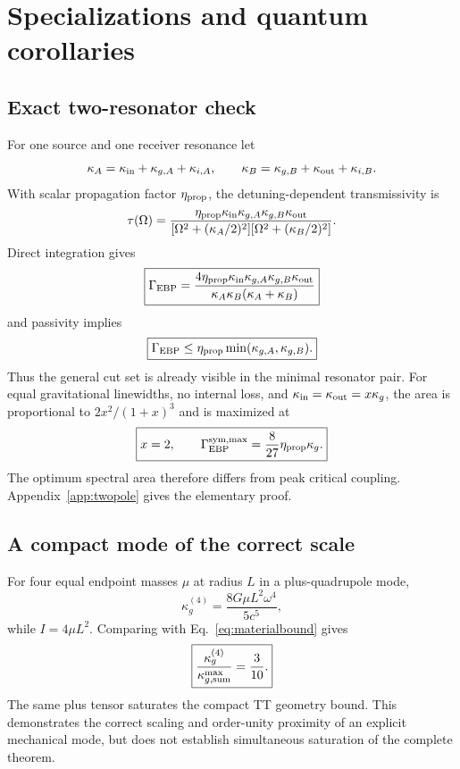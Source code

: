 \section{Specializations and quantum corollaries}
\label{sec:examplescapacity}

\subsection{Exact two-resonator check}

For one source and one receiver resonance let
\begin{equation}
\kappa_A=\kappa_{\rm in}+\kappa_{g,A}+\kappa_{i,A},
\qquad
\kappa_B=\kappa_{g,B}+\kappa_{\rm out}+\kappa_{i,B}.
\end{equation}
With scalar propagation factor $\eta_{\rm prop}$, the detuning-dependent transmissivity is
\begin{equation}
\tau(\Omega)
=\frac{\eta_{\rm prop}\kappa_{\rm in}\kappa_{g,A}\kappa_{g,B}\kappa_{\rm out}}
{[\Omega^2+(\kappa_A/2)^2][\Omega^2+(\kappa_B/2)^2]}.
\label{eq:twopoleTau}
\end{equation}
Direct integration gives
\begin{equation}
\boxed{
\Gamma_{\rm EBP}
=\frac{4\eta_{\rm prop}\kappa_{\rm in}\kappa_{g,A}\kappa_{g,B}\kappa_{\rm out}}
{\kappa_A\kappa_B(\kappa_A+\kappa_B)}}
\label{eq:exactEBP}
\end{equation}
and passivity implies
\begin{equation}
\boxed{
\Gamma_{\rm EBP}\le
\eta_{\rm prop}\min(\kappa_{g,A},\kappa_{g,B}).}
\label{eq:twopolecut}
\end{equation}
Thus the general cut set is already visible in the minimal resonator pair. For equal gravitational linewidths, no internal loss, and $\kappa_{\rm in}=\kappa_{\rm out}=x\kappa_g$, the area is proportional to $2x^2/(1+x)^3$ and is maximized at
\begin{equation}
\boxed{x=2,\qquad
\Gamma_{\rm EBP}^{\rm sym,max}=\frac8{27}\eta_{\rm prop}\kappa_g.}
\label{eq:827}
\end{equation}
The optimum spectral area therefore differs from peak critical coupling. Appendix~\ref{app:twopole} gives the elementary proof.

\subsection{A compact mode of the correct scale}

For four equal endpoint masses $\mu$ at radius $L$ in a plus-quadrupole mode,
\begin{equation}
\kappa_g^{(4)}=\frac{8G\mu L^2\omega^4}{5c^5},
\label{eq:fourmasswidth}
\end{equation}
while $I=4\mu L^2$. Comparing with Eq.~\eqref{eq:materialbound} gives
\begin{equation}
\boxed{
\frac{\kappa_g^{(4)}}{\kappa_{g,{\rm sum}}^{\max}}
=\frac3{10}.}
\label{eq:threetenths}
\end{equation}
The same plus tensor saturates the compact TT geometry bound. This demonstrates the correct scaling and order-unity proximity of an explicit mechanical mode, but does not establish simultaneous saturation of the complete theorem.

